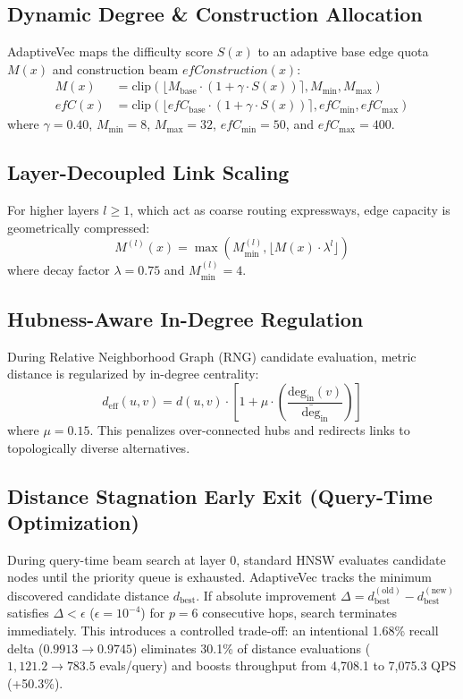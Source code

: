 \documentclass[conference,10pt]{IEEEtran}
\begin{document}
\subsection{Dynamic Degree \& Construction Allocation}
AdaptiveVec maps the difficulty score $S(x)$ to an adaptive base edge quota $M(x)$ and construction beam $efConstruction(x)$:
\begin{align}
M(x) &= \text{clip}\left( \lfloor M_{\text{base}} \cdot (1 + \gamma \cdot S(x)) \rceil, M_{\text{min}}, M_{\text{max}} \right) \\
efC(x) &= \text{clip}\left( \lfloor efC_{\text{base}} \cdot (1 + \gamma \cdot S(x)) \rceil, efC_{\text{min}}, efC_{\text{max}} \right)
\end{align}
where $\gamma = 0.40$, $M_{\text{min}} = 8$, $M_{\text{max}} = 32$, $efC_{\text{min}} = 50$, and $efC_{\text{max}} = 400$.

\subsection{Layer-Decoupled Link Scaling}
For higher layers $l \ge 1$, which act as coarse routing expressways, edge capacity is geometrically compressed:
\begin{equation}
M^{(l)}(x) = \max\left( M_{\text{min}}^{(l)}, \lfloor M(x) \cdot \lambda^l \rfloor \right)
\end{equation}
where decay factor $\lambda = 0.75$ and $M_{\text{min}}^{(l)} = 4$.

\subsection{Hubness-Aware In-Degree Regulation}
During Relative Neighborhood Graph (RNG) candidate evaluation, metric distance is regularized by in-degree centrality:
\begin{equation}
d_{\text{eff}}(u, v) = d(u, v) \cdot \left[ 1 + \mu \cdot \left( \frac{\text{deg}_{\text{in}}(v)}{\bar{\text{deg}}_{\text{in}}} \right) \right]
\end{equation}
where $\mu = 0.15$. This penalizes over-connected hubs and redirects links to topologically diverse alternatives.

\subsection{Distance Stagnation Early Exit (Query-Time Optimization)}
During query-time beam search at layer 0, standard HNSW evaluates candidate nodes until the priority queue is exhausted. AdaptiveVec tracks the minimum discovered candidate distance $d_{\text{best}}$. If absolute improvement $\Delta = d_{\text{best}}^{(\text{old})} - d_{\text{best}}^{(\text{new})}$ satisfies $\Delta < \epsilon$ ($\epsilon = 10^{-4}$) for $p = 6$ consecutive hops, search terminates immediately. This introduces a controlled trade-off: an intentional 1.68\% recall delta ($0.9913 \to 0.9745$) eliminates 30.1\% of distance evaluations ($1,121.2 \to 783.5$ evals/query) and boosts throughput from 4,708.1 to 7,075.3 QPS (+50.3\%).
\end{document}

